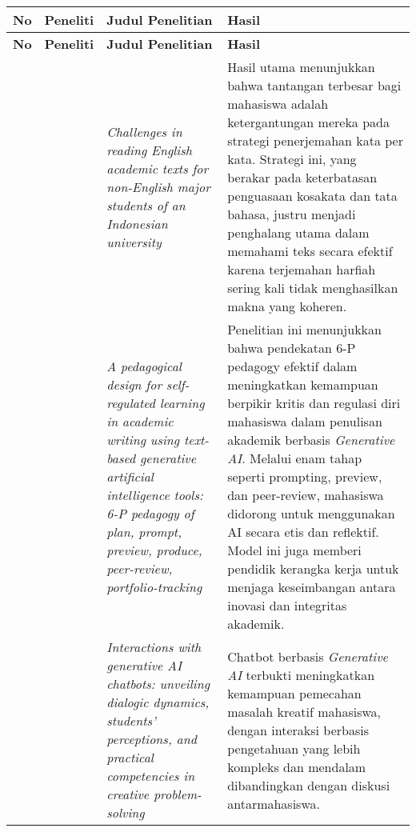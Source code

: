 \begin{table}[H]
  \caption{Rangkuman Penelitian Terdahulu}
  \label{tab:kajian-penelitian}
  \centering
  \begin{longtable}{|>{\centering\arraybackslash}m{0.5cm}|>{\raggedright\arraybackslash}p{3cm}|>{\raggedright\arraybackslash}p{3.5cm}|>{\raggedright\arraybackslash}p{5cm}|}
    \hline
    \textbf{No} & \textbf{Peneliti} & \textbf{Judul Penelitian} & \textbf{Hasil} \\
    \hline
    \endfirsthead

    \hline
    \textbf{No} & \textbf{Peneliti} & \textbf{Judul Penelitian} & \textbf{Hasil} \\
    \hline
    \endhead

    \hline
    1 & \cite{Dardjito} & \textit{Challenges in reading English academic texts for non-English major students of an Indonesian university} & Hasil utama menunjukkan bahwa tantangan terbesar bagi mahasiswa adalah ketergantungan mereka pada strategi penerjemahan kata per kata. Strategi ini, yang berakar pada keterbatasan penguasaan kosakata dan tata bahasa, justru menjadi penghalang utama dalam memahami teks secara efektif karena terjemahan harfiah sering kali tidak menghasilkan makna yang koheren. \\
    \hline
    2 & \cite{kong2024pedagogical} & \textit{A pedagogical design for self-regulated learning in academic writing using text-based generative artificial intelligence tools: 6-P pedagogy of plan, prompt, preview, produce, peer-review, portfolio-tracking} & Penelitian ini menunjukkan bahwa pendekatan 6-P pedagogy efektif dalam meningkatkan kemampuan berpikir kritis dan regulasi diri mahasiswa dalam penulisan akademik berbasis \textit{Generative AI}. Melalui enam tahap seperti prompting, preview, dan peer-review, mahasiswa didorong untuk menggunakan AI secara etis dan reflektif. Model ini juga memberi pendidik kerangka kerja untuk menjaga keseimbangan antara inovasi dan integritas akademik. \\
    \hline
    3 & \cite{Song2025Interactions} & \textit{Interactions with generative AI chatbots: unveiling dialogic dynamics, students' perceptions, and practical competencies in creative problem-solving} & Chatbot berbasis \textit{Generative AI} terbukti meningkatkan kemampuan pemecahan masalah kreatif mahasiswa, dengan interaksi berbasis pengetahuan yang lebih kompleks dan mendalam dibandingkan dengan diskusi antarmahasiswa. \\
    \hline
  \end{longtable}
\end{table}